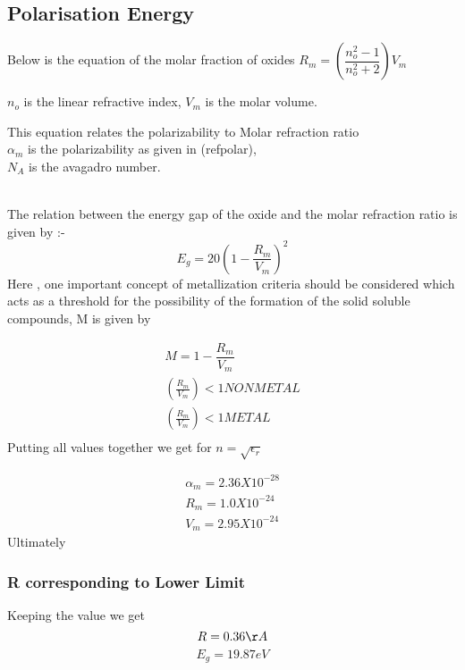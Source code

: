 \documentclass[journal]{IEEEtran}
\begin{document}
\subsection{Polarisation Energy}
Below is the equation of the molar fraction of oxides \cite{Erbium}
$
R_m = (\dfrac{n^2_o -1}{n^2_o +2 })V_m $

$n_o$ is the linear refractive index, 
$V_m$ is the molar volume.

\hfill

This equation relates the polarizability to Molar refraction ratio\\
$\alpha_m$ is the polarizability as given in (ref{polar}), \\
$N_A$ is the avagadro number.\\

\

The relation between the energy gap of the oxide and the molar refraction  ratio is given by :-
\begin{equation}
E_g = 20(1- \dfrac{R_m}{V_m})^2
\end{equation}
Here , one important concept of metallization criteria should be considered which acts as a threshold for the possibility of the formation of the solid soluble compounds, M is given by

\begin{align}
M = 1 - \dfrac{R_m}{V_m}                \\
(\frac{R_m}{V_m}) < 1   NON METAL        \\
(\frac{R_m}{V_m}) < 1      METAL          \\
\end{align}
Putting all values together we get for $n = \sqrt{\epsilon_r}$

\begin{align*}
\alpha_m = 2.36 X 10^{-28} \\
R_m =  1.0 X 10^{-24}      \\
V_m = 2.95 X 10^{-24}        
\end{align*}
Ultimately
\subsubsection{R corresponding to Lower Limit}
Keeping the value we get 
\begin{equation}
R = 0.36 \AA
\end{equation}
\begin{equation}
E_g = 19.87 eV
\end{equation}
\end{document}

